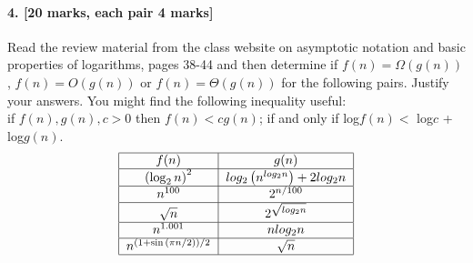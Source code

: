 \documentclass[a4paper]{scrartcl}
\begin{document}
\paragraph{4. [20 marks, each pair 4 marks]}
\label{sec:Question 4}
Read the review material from the class website on asymptotic notation and basic properties of logarithms, pages 38-44 and then determine if $f(n) = \Omega(g(n))$, $f(n) = O(g(n))$ or $f (n) = \Theta(g(n))$ for the following pairs. Justify your answers. You might find the following inequality useful: \\
if $f (n), g(n), c > 0$ then $f (n) < c g(n)$; if and only if log$f(n) <$ log$c$ + log$g(n)$.
\begin{align*}
\begin{tabular}{|c | c |}
  \hline
  $f(n)$ & $g(n)$ \\
  \hline
  $\left(\log_2n\right)^2$ & $log_2\left(n^{log_2{n}}\right) + 2 log_2n$ \\
  \hline
  $n^{100}$ & $2^{n/100}$ \\
  \hline
  $\sqrt{n}$ & $2^{\sqrt{log_2 n}}$\\
    \hline
  $n^{1.001}$ & $n log_2 n$\\
  \hline
  $n^{(1+\sin{(\pi n/2))}/2}$ &  $\sqrt{n}$\\
  \hline
\end{tabular}
\end{align*}
\end{document}
